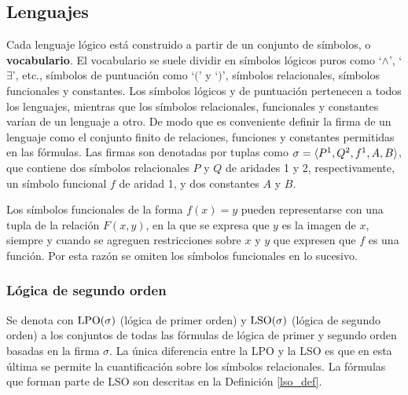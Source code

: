 \subsection{Lenguajes}
Cada lenguaje lógico está construido a partir de un conjunto de símbolos, o
\textbf{vocabulario}.
El vocabulario se suele dividir en símbolos lógicos puros como `$\land$',
`$\exists$', etc., símbolos de puntuación como `$($' y `$)$', símbolos
relacionales, símbolos funcionales y constantes. Los símbolos lógicos y de
puntuación pertenecen a todos los lenguajes, mientras que los símbolos
relacionales, funcionales y constantes varían de un lenguaje a otro. De modo
que es conveniente definir la firma de un lenguaje como el conjunto finito de
relaciones, funciones y constantes permitidas en las fórmulas. Las firmas son
denotadas por tuplas como $\sigma=\langle P^1,Q^2,f^1,A,B \rangle$, que contiene dos
símbolos relacionales $P$ y $Q$ de aridades 1 y 2, respectivamente, un símbolo
funcional $f$ de aridad 1, y dos constantes $A$ y $B$.

Los símbolos funcionales de la forma $f(x) = y$ pueden representarse con una
tupla de la relación $F(x, y)$, en la que se expresa que $y$ es la imagen de
$x$, siempre y cuando se agreguen restricciones sobre $x$ y $y$ que expresen
que $f$ es una función.
Por esta razón se omiten los símbolos funcionales en lo sucesivo.

\subsubsection{Lógica de segundo orden}
Se denota con $\text{LPO}(\sigma)$ (lógica de primer orden) y $\text{LSO}(\sigma)$ (lógica
de segundo orden) a los conjuntos de todas las
fórmulas de lógica de primer y segundo orden basadas en la firma $\sigma$.
La única diferencia entre la LPO y la LSO es que en esta última se permite la
cuantificación sobre los símbolos relacionales. La fórmulas que forman parte
de LSO son descritas en la Definición \ref{lso_def}.

